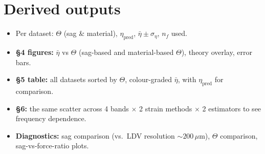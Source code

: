\documentclass[11pt,a4paper]{article}
\begin{document}
\section*{Derived outputs}
\begin{itemize}
\item Per dataset: $\Theta$ (sag \& material), $\eta_{\mathrm{pred}}$, $\bar\eta\pm\sigma_\eta$, $n_f$ used.
\item \textbf{\S4 figures:} $\bar\eta$ vs $\Theta$ (sag-based and material-based $\Theta$), theory overlay, error bars.
\item \textbf{\S5 table:} all datasets sorted by $\Theta$, colour-graded $\bar\eta$, with $\eta_{\mathrm{pred}}$ for comparison.
\item \textbf{\S6:} the same scatter across 4 bands $\times$ 2 strain methods $\times$ 2 estimators to see frequency dependence.
\item \textbf{Diagnostics:} sag comparison (vs.\ LDV resolution $\sim200\,\mu$m), $\Theta$ comparison, sag-vs-force-ratio plots.
\end{itemize}
\end{document}
